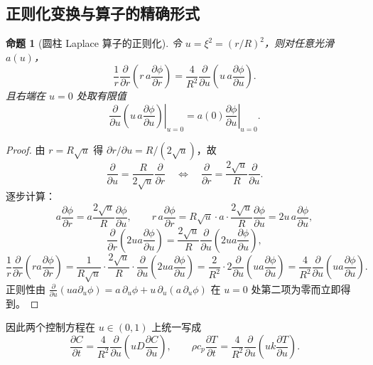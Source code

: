\documentclass[11pt,a4paper]{article}
\newtheorem{proposition}{命题}
\theoremstyle{definition}
\begin{document}
\subsection{正则化变换与算子的精确形式}

\begin{proposition}[圆柱 Laplace 算子的正则化]
令 $u=\xi^2=(r/R)^2$，则对任意光滑 $a(u)$，
\begin{equation}
\frac{1}{r}\frac{\partial}{\partial r}\!\left(r\,a\frac{\partial \phi}{\partial r}\right)
=\frac{4}{R^2}\frac{\partial}{\partial u}\!\left(u\,a\frac{\partial \phi}{\partial u}\right).
\label{eq:regularize}
\end{equation}
且右端在 $u=0$ 处取有限值
\[
\left.\frac{\partial}{\partial u}\!\left(u\,a\frac{\partial \phi}{\partial u}\right)\right|_{u=0}
=a(0)\left.\frac{\partial \phi}{\partial u}\right|_{u=0}.
\]
\end{proposition}

\begin{proof}
由 $r=R\sqrt{u}$ 得 $\partial r/\partial u=R/(2\sqrt u)$，故
\[
\frac{\partial}{\partial u}=\frac{R}{2\sqrt u}\frac{\partial}{\partial r}
\quad\Longleftrightarrow\quad
\frac{\partial}{\partial r}=\frac{2\sqrt u}{R}\frac{\partial}{\partial u}.
\]
逐步计算：
\[
a\frac{\partial \phi}{\partial r}=a\frac{2\sqrt u}{R}\frac{\partial \phi}{\partial u},
\qquad
r\,a\frac{\partial \phi}{\partial r}=R\sqrt u\cdot a\cdot\frac{2\sqrt u}{R}\frac{\partial \phi}{\partial u}
=2u\,a\frac{\partial \phi}{\partial u},
\]
\[
\frac{\partial}{\partial r}\!\left(2ua\frac{\partial \phi}{\partial u}\right)
=\frac{2\sqrt u}{R}\frac{\partial}{\partial u}\!\left(2ua\frac{\partial \phi}{\partial u}\right),
\]
\[
\frac{1}{r}\frac{\partial}{\partial r}\!\left(r a\frac{\partial \phi}{\partial r}\right)
=\frac{1}{R\sqrt u}\cdot\frac{2\sqrt u}{R}\cdot
\frac{\partial}{\partial u}\!\left(2ua\frac{\partial \phi}{\partial u}\right)
=\frac{2}{R^2}\cdot 2\frac{\partial}{\partial u}\!\left(ua\frac{\partial \phi}{\partial u}\right)
=\frac{4}{R^2}\frac{\partial}{\partial u}\!\left(ua\frac{\partial \phi}{\partial u}\right).
\]
正则性由
$\frac{\partial}{\partial u}(ua\partial_u\phi)=a\,\partial_u\phi+u\,\partial_u(a\,\partial_u\phi)$
在 $u=0$ 处第二项为零而立即得到。
\end{proof}

因此两个控制方程在 $u\in(0,1)$ 上统一写成
\begin{equation}
\boxed{\;
\frac{\partial C}{\partial t}=\frac{4}{R^2}\frac{\partial}{\partial u}\!\left(uD\frac{\partial C}{\partial u}\right),
\qquad
\rho c_p\frac{\partial T}{\partial t}=\frac{4}{R^2}\frac{\partial}{\partial u}\!\left(uk\frac{\partial T}{\partial u}\right).
\;}
\label{eq:gov_u}
\end{equation}
\end{document}
